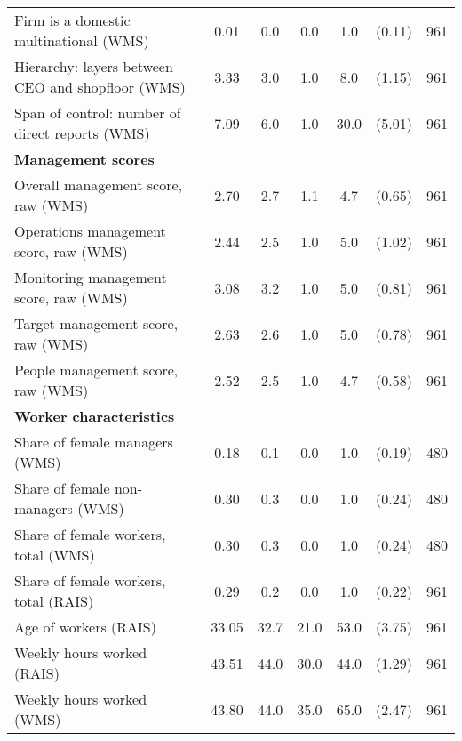 {\begin{tabular}{l*{1}{cccccc}}
Firm is a domestic multinational (WMS)&        0.01&         0.0&         0.0&         1.0&      (0.11)&         961\\
Hierarchy: layers between CEO and shopfloor (WMS)&        3.33&         3.0&         1.0&         8.0&      (1.15)&         961\\
Span of control: number of direct reports (WMS)&        7.09&         6.0&         1.0&        30.0&      (5.01)&         961\\
\textbf{Management scores}&            &            &            &            &            &            \\
Overall management score, raw (WMS)&        2.70&         2.7&         1.1&         4.7&      (0.65)&         961\\
Operations management score, raw (WMS)&        2.44&         2.5&         1.0&         5.0&      (1.02)&         961\\
Monitoring management score, raw (WMS)&        3.08&         3.2&         1.0&         5.0&      (0.81)&         961\\
Target management score, raw (WMS)&        2.63&         2.6&         1.0&         5.0&      (0.78)&         961\\
People management score, raw (WMS)&        2.52&         2.5&         1.0&         4.7&      (0.58)&         961\\
\textbf{Worker characteristics}&            &            &            &            &            &            \\
Share of female managers (WMS)&        0.18&         0.1&         0.0&         1.0&      (0.19)&         480\\
Share of female non-managers (WMS)&        0.30&         0.3&         0.0&         1.0&      (0.24)&         480\\
Share of female workers, total (WMS)&        0.30&         0.3&         0.0&         1.0&      (0.24)&         480\\
Share of female workers, total (RAIS)&        0.29&         0.2&         0.0&         1.0&      (0.22)&         961\\
Age of workers (RAIS)&       33.05&        32.7&        21.0&        53.0&      (3.75)&         961\\
Weekly hours worked (RAIS)&       43.51&        44.0&        30.0&        44.0&      (1.29)&         961\\
Weekly hours worked (WMS)&       43.80&        44.0&        35.0&        65.0&      (2.47)&         961\\

\end{tabular}}
